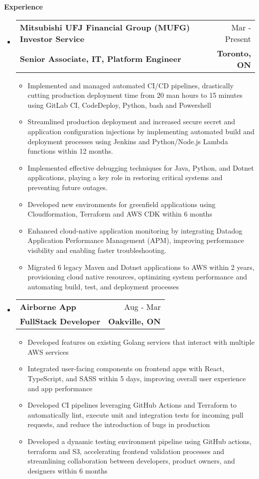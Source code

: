 \documentclass[letterpaper,11.9pt,arimo]{article}[leftmargin=*]
\makeatletter
\def \entryspacing {-2pt}
\renewcommand{\section}[2]{\vspace{5pt}
\colorbox{secondary}{\color{white}\raggedbottom\normalsize\textbf{{#1}{\hspace{7pt}#2}}}
}
\newcommand{\resumeEntryStart}{\begin{itemize}[leftmargin=2.5mm]}
\newcommand{\resumeEntryEnd}{\end{itemize}\vspace{\entryspacing}}
\newcommand{\resumeItemListStart}{\begin{itemize}[leftmargin=4.5mm]}
\newcommand{\resumeItemListEnd}{\end{itemize}}
\newcommand{\resumeItem}[1]{
    \item\small{
            {#1 \vspace{-3pt}}
    }
}
\newcommand{\resumeEntryTSDL}[4]{
    \vspace{-1pt}\item[]
    \begin{tabularx}{0.97\textwidth}{X@{\hspace{60pt}}r}
    \textbf{\color{primary}#1} & {\firabook\color{accent}\small#2} \\
    \textbf{\color{accent}\small#3} & \textbf{\color{accent}\small#4} \\
    \end{tabularx}\vspace{-6pt}
}
\newcommand{\boldsize}[1]{\fontsize{10}{15}\selectfont\color{secondary}\textbf{#1}}
\makeatother
\begin{document}
    \section{\faPieChart}{Experience}

    \resumeEntryStart
    \resumeEntryTSDL
    {Mitsubishi UFJ Financial Group (MUFG) Investor Service}{Mar \text{2021} - Present}
    {\boldsize{Senior Associate, IT, Platform Engineer}}{Toronto, ON}
    \resumeItemListStart
    \resumeItem{Implemented and managed automated CI/CD pipelines, drastically cutting production deployment time from 20 man hours to 15 minutes using GitLab CI, CodeDeploy, Python, bash and Powershell}
    \resumeItem {Streamlined production deployment and increased secure secret and application configuration injections by implementing automated build and deployment processes using Jenkins and Python/Node.js Lambda functions within 12 months.}
    \resumeItem {Implemented effective debugging techniques for Java, Python, and Dotnet applications, playing a key role in restoring critical systems and preventing future outages.}
    \resumeItem {Developed new environments for greenfield applications using Cloudformation, Terraform and AWS CDK within 6 months}
    \resumeItem {Enhanced cloud-native application monitoring by integrating Datadog Application Performance Management (APM), improving performance visibility and enabling faster troubleshooting.}
    \resumeItem  {Migrated 6 legacy Maven and Dotnet applications to AWS within 2 years, provisioning cloud native resources, optimizing system performance and automating build, test, and deployment processes}

    \resumeItemListEnd
    \resumeEntryEnd

    \resumeEntryStart
    \resumeEntryTSDL
    {Airborne App}{Aug \text{2020} - Mar \text{2021}}
    {\boldsize{FullStack Developer}}{Oakville, ON}
    \resumeItemListStart
    \resumeItem{ Developed features on existing Golang services that interact with multiple AWS services}
    \resumeItem{ Integrated user-facing components on frontend apps with React, TypeScript, and SASS within 5 days, improving overall user experience and app performance}
    \resumeItem{Developed CI pipelines leveraging GitHub Actions and Terraform to automatically lint, execute unit and integration tests for incoming pull requests, and reduce the introduction of bugs in production}
    \resumeItem{Developed a dynamic testing environment pipeline using GitHub actions, terraform and S3, accelerating frontend validation processes and streamlining collaboration between developers, product owners, and designers within 6 months}
    \resumeItemListEnd
    \resumeEntryEnd
\end{document}
